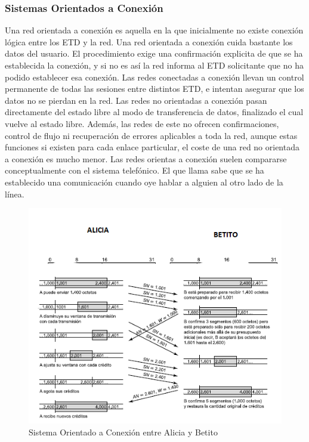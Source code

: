 	\subsubsection{Sistemas Orientados a Conexi\'on}
	Una red orientada a conexi\'on es aquella en la que inicialmente no existe conexi\'on l\'ogica entre los ETD y la red. Una red orientada a conexi\'on cuida bastante los datos del usuario. El procedimiento exige una confirmaci\'on explicita de que se ha establecida la conexi\'on, y si no es as\'i la red informa al ETD solicitante que no ha podido establecer esa conexi\'on. Las redes conectadas a conexi\'on llevan un control permanente de todas las sesiones entre distintos ETD, e intentan asegurar que los datos no se pierdan en la red. Las redes no orientadas a conexi\'on pasan directamente del estado libre al modo de transferencia de datos, finalizado el cual vuelve al estado libre. Adem\'as, las redes de este no ofrecen confirmaciones, control de flujo ni recuperaci\'on de errores aplicables a toda la red, aunque estas funciones si existen para cada enlace particular, el coste de una red no orientada a conexi\'on es mucho menor. Las redes orientas a conexi\'on suelen compararse conceptualmente con el sistema telef\'onico. El que llama sabe que se ha establecido una comunicaci\'on cuando oye hablar a alguien al otro lado de la l\'inea.
	\begin{figure}[h]
			\centering		
			\includegraphics[width=\textwidth]{ABC}
			\caption{Sistema Orientado a Conexi\'on entre Alicia y Betito}
	\end{figure}
\clearpage
